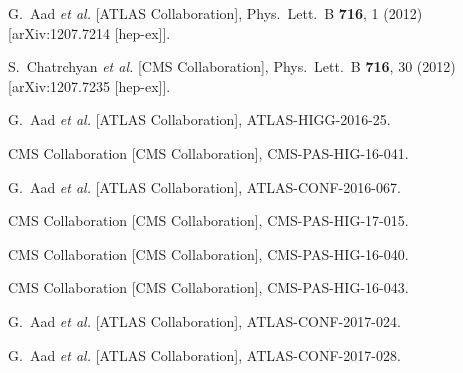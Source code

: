 \documentclass[10pt]{article}
\begin{document}
\begin{thebibliography}{99}


  G.~Aad {\it et al.}  [ATLAS Collaboration],
  Phys.\ Lett.\ B {\bf 716}, 1 (2012)
  [arXiv:1207.7214 [hep-ex]].
  
  
  S.~Chatrchyan {\it et al.}  [CMS Collaboration],
  Phys.\ Lett.\ B {\bf 716}, 30 (2012)
  [arXiv:1207.7235 [hep-ex]].


  G.~Aad {\it et al.}  [ATLAS Collaboration],
  ATLAS-HIGG-2016-25.


  CMS Collaboration [CMS Collaboration],
  CMS-PAS-HIG-16-041.


  G.~Aad {\it et al.}  [ATLAS Collaboration],
  ATLAS-CONF-2016-067.


  CMS Collaboration  [CMS Collaboration],
  CMS-PAS-HIG-17-015.


  CMS Collaboration  [CMS Collaboration],
  CMS-PAS-HIG-16-040.


  CMS Collaboration [CMS Collaboration],
  CMS-PAS-HIG-16-043.


  G.~Aad {\it et al.}  [ATLAS Collaboration],
  ATLAS-CONF-2017-024.


  G.~Aad {\it et al.}  [ATLAS Collaboration],
  ATLAS-CONF-2017-028.


\end{thebibliography}

 
\end{document}
